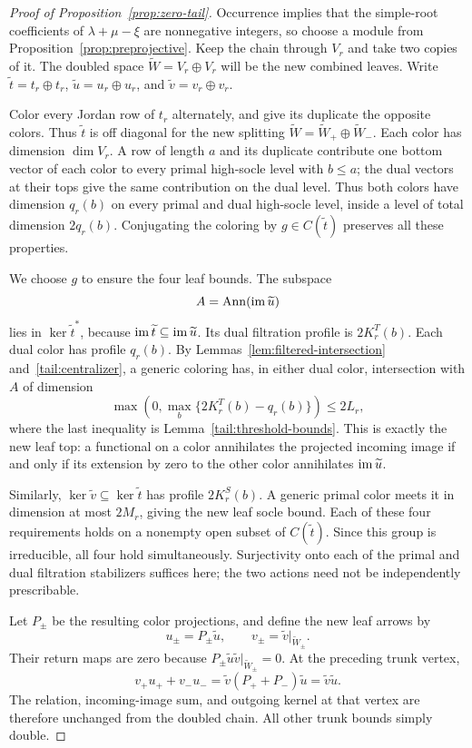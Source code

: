 \begin{proof}[Proof of Proposition~\ref{prop:zero-tail}]
Occurrence implies that the simple-root coefficients of
\(\lambda+\mu-\xi\) are nonnegative integers, so choose a module
from Proposition~\ref{prop:preprojective}.
Keep the chain through \(V_r\) and take two copies of it.
The doubled space
\(\widetilde W=V_r\oplus V_r\) will be the new combined leaves.
Write \(\widetilde t=t_r\oplus t_r\),
\(\widetilde u=u_r\oplus u_r\), and
\(\widetilde v=v_r\oplus v_r\).

Color every Jordan row of \(t_r\) alternately, and give its duplicate
the opposite colors.  Thus \(\widetilde t\) is off diagonal for the
new splitting \(\widetilde W=\widetilde W_+\oplus\widetilde W_-\).
Each color has dimension \(\dim V_r\). A row of length \(a\) and
its duplicate contribute one bottom vector of each color to every
primal high-socle level with \(b\le a\); the dual vectors at their
tops give the same contribution on the dual level. Thus both colors
have dimension \(q_r(b)\) on every primal and dual high-socle level,
inside a level of total dimension \(2q_r(b)\).
Conjugating the coloring by \(g\in C(\widetilde t)\) preserves all
these properties.

We choose \(g\) to ensure the four leaf bounds.
The subspace
\[
 A=\operatorname{Ann}(\operatorname{im}\widetilde u)
\]
lies in \(\ker\widetilde t^*\), because
\(\operatorname{im}\widetilde t\subseteq\operatorname{im}\widetilde u\).
Its dual filtration profile is \(2K_r^T(b)\).
Each dual color has profile \(q_r(b)\).
By Lemmas~\ref{lem:filtered-intersection}
and~\ref{tail:centralizer}, a generic coloring has, in either
dual color, intersection with \(A\) of dimension
\[
 \max\left(0,\max_b\{2K_r^T(b)-q_r(b)\}\right)
 \le 2L_r ,
\]
where the last inequality is Lemma~\ref{tail:threshold-bounds}.
This is exactly the new leaf top: a functional on a color
annihilates the projected incoming image if and only if its extension
by zero to the other color annihilates \(\operatorname{im}\widetilde u\).

Similarly, \(\ker\widetilde v\subseteq\ker\widetilde t\) has profile
\(2K_r^S(b)\).  A generic primal color meets it in dimension at most
\(2M_r\), giving the new leaf socle bound.
Each of these four requirements holds on a nonempty open subset of
\(C(\widetilde t)\).  Since this group is irreducible, all four hold
simultaneously.  Surjectivity onto each of the primal and dual
filtration stabilizers suffices here; the two actions need not be
independently prescribable.

Let \(P_\pm\) be the resulting color projections, and define the new
leaf arrows by
\[
 u_\pm=P_\pm\widetilde u,\qquad
 v_\pm=\widetilde v|_{\widetilde W_\pm}.
\]
Their return maps are zero because
\(P_\pm\widetilde u\widetilde v|_{\widetilde W_\pm}=0\).
At the preceding trunk vertex,
\[
 v_+u_++v_-u_-=
 \widetilde v(P_++P_-)\widetilde u
 =\widetilde v\widetilde u .
\]
The relation, incoming-image sum, and outgoing kernel at that vertex
are therefore unchanged from the doubled chain.  All other trunk
bounds simply double.


\end{proof}
